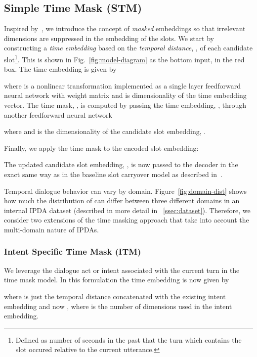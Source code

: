 \documentclass[11pt,a4paper]{article}
\begin{document}
\subsection{Simple Time Mask (STM)}
\label{sssec:tm-s}

Inspired by~\cite{time-mask}, we introduce the concept of \textit{masked} embeddings so that irrelevant dimensions are suppressed in the embedding of the slots. 
We start by constructing a \textit{time embedding} based on the \textit{temporal distance}, , of each candidate slot\footnote{
Defined as number of seconds in the past that the turn which contains the slot occured relative to the current utterance.}.
This is shown in Fig.~\ref{fig:model-diagram} as the bottom input, in the red box.
The time embedding is given by

where  is a nonlinear transformation implemented as a single layer feedforward neural network with weight matrix  and  is 
dimensionality of the time embedding vector. The time mask, , is computed by passing the time embedding, , through another feedforward neural network

where  and  is the dimensionality of the candidate slot embedding, .

Finally, we apply the time mask to the encoded slot embedding:

The updated candidate slot embedding, , is now passed to the decoder in the exact same way as in the baseline slot carryover model as described in~\cite{cc-inter}.

Temporal dialogue behavior can vary by domain. Figure~\ref{fig:domain-dist} shows how much the distribution of  can differ between three different domains in an internal IPDA dataset (described in more detail in ~\ref{ssec:dataset}). Therefore, we consider two extensions of the time masking approach that take into account the multi-domain nature of IPDAs.

\subsubsection{Intent Specific Time Mask (ITM)}
\label{sssec:tm-i}

We leverage the dialogue act or intent associated with the current turn in the time mask model.
In this formulation the time embedding is now given by

where  is just the temporal distance concatenated with the existing intent embedding  and now , where  is the number of dimensions used in the intent embedding.
\end{document}
